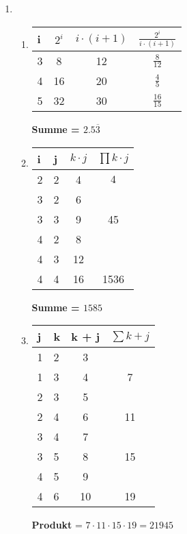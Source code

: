 \documentclass[a4paper]{article}
\begin{document}
	\begin{enumerate}
		\item
		\begin{enumerate}
			\item
			\begin{center}
				\begin{tabular}{|l|c|c|c|}
					\firsthline
						i & $2^{i}$ & $i \cdot (i + 1)$ & $\frac{2^{i}}{i \cdot (i + 1)}$ \\
					\hline
						3 & 8 & 12 & $\frac{8}{12}$ \\
						4 & 16 & 20 & $\frac{4}{5}$ \\
						5 & 32 & 30 & $\frac{16}{15}$ \\
					\hline
				\end{tabular}
				\newline
				\textbf{Summe = $2.5\overline{3}$}
			\end{center}
			
			\item
			\begin{center}
				\begin{tabular}{|l|l|c|c|}
					\firsthline
						i & j & $k \cdot j$ & $\displaystyle\prod k \cdot j$ \\
					\hline
						2 & 2 & 4 & $4$ \\
						3 & 2 & 6 &  \\
						3 & 3 & 9 & 45 \\
						4 & 2 & 8 &  \\
						4 & 3 & 12 &  \\
						4 & 4 & 16 & 1536 \\
					\hline
				\end{tabular}
				\newline
				\textbf{Summe = $1585$}
			\end{center}
			
			\item
			\begin{center}
				\begin{tabular}{|l|l|c|c|}
					\firsthline
						j & k & k + j & $\displaystyle\sum k + j$ \\
					\hline
						1 & 2 & 3 &  \\
						1 & 3 & 4 & 7 \\
						2 & 3 & 5 &  \\
						2 & 4 & 6 & 11 \\
						3 & 4 & 7 &  \\
						3 & 5 & 8 & 15 \\
						4 & 5 & 9 &  \\
						4 & 6 & 10 & 19 \\
					\hline
				\end{tabular}
				\newline
				\textbf{Produkt} = $7 \cdot 11 \cdot 15 \cdot 19 = 21945$
			\end{center}
		\end{enumerate}
		

\end{enumerate}
\end{document}
